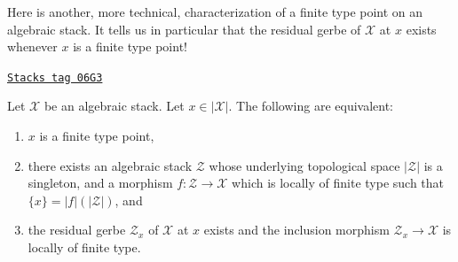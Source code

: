 Here is another, more technical, characterization of a finite type
point on an algebraic stack. It tells us in particular that the residual
gerbe of $\mathcal{X}$ at $x$ exists whenever $x$ is a finite type point!

\begin{lemma}
\label{stacks-morphisms-lemma-point-finite-type-monomorphism}
\href{https://stacks.math.columbia.edu/tag/06G3}{\texttt{Stacks tag 06G3}}

Let $\mathcal{X}$ be an algebraic stack.
Let $x \in |\mathcal{X}|$. The following are equivalent:
\begin{enumerate}
\item $x$ is a finite type point,
\item there exists an algebraic stack $\mathcal{Z}$
whose underlying topological space $|\mathcal{Z}|$ is a singleton,
and a morphism $f : \mathcal{Z} \to \mathcal{X}$ which is
locally of finite type such that $\{x\} = |f|(|\mathcal{Z}|)$, and
\item the residual gerbe $\mathcal{Z}_x$ of $\mathcal{X}$ at $x$ exists
and the inclusion morphism $\mathcal{Z}_x \to \mathcal{X}$ is locally of
finite type.
\end{enumerate}
\end{lemma}

